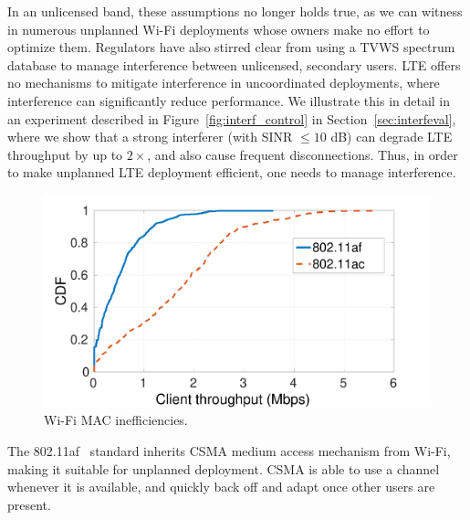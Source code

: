 In an unlicensed band, these assumptions no longer holds true, as we can witness in numerous unplanned Wi-Fi deployments whose owners make no effort to optimize them. 
Regulators have also stirred clear from using a TVWS spectrum database to manage interference between unlicensed, secondary users. 
LTE offers no mechanisms to mitigate interference in uncoordinated deployments, where interference can significantly reduce performance. 
We illustrate this in detail in an experiment described in Figure~\ref{fig:interf_control} in Section~\ref{sec:interfeval},
where we show that a strong interferer (with SINR $\leq 10$ dB) can degrade LTE throughput by up to $2\times$, and also cause frequent disconnections. 
Thus, in order to make unplanned LTE deployment efficient, one needs to manage interference. 



\begin{figure}[t]
  \centering
    \includegraphics[width=\columnwidth]{./figs/af_vs_ac.pdf}
    \vspace{-0.3in}
  \caption{Wi-Fi MAC inefficiencies.}
  \label{fig:inefficiencies}
\vspace{-0.25in}
\end{figure}



The 802.11af~\cite{Rice_af} standard inherits CSMA medium access mechanism from Wi-Fi, making it suitable for unplanned deployment. 
CSMA is able to use a channel whenever it is available, and quickly back off and adapt once other users are present. 


